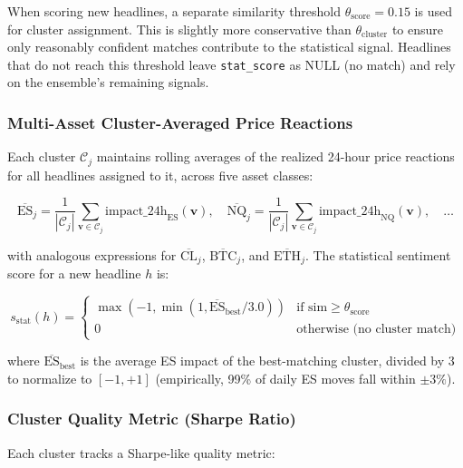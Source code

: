 When scoring new headlines, a separate similarity threshold $\theta_{\text{score}} = 0.15$ is used for cluster assignment. This is slightly more conservative than $\theta_{\text{cluster}}$ to ensure only reasonably confident matches contribute to the statistical signal. Headlines that do not reach this threshold leave \texttt{stat\_score} as NULL (no match) and rely on the ensemble's remaining signals.

\subsubsection{Multi-Asset Cluster-Averaged Price Reactions}

Each cluster $\mathcal{C}_j$ maintains rolling averages of the realized 24-hour price reactions for all headlines assigned to it, across five asset classes:

\begin{equation}
\overline{\text{ES}}_j = \frac{1}{|\mathcal{C}_j|} \sum_{\mathbf{v} \in \mathcal{C}_j} \text{impact\_24h}_\text{ES}(\mathbf{v}), \quad
\overline{\text{NQ}}_j = \frac{1}{|\mathcal{C}_j|} \sum_{\mathbf{v} \in \mathcal{C}_j} \text{impact\_24h}_\text{NQ}(\mathbf{v}), \quad \ldots
\label{eq:cluster_avg}
\end{equation}

with analogous expressions for $\overline{\text{CL}}_j$, $\overline{\text{BTC}}_j$, and $\overline{\text{ETH}}_j$. The statistical sentiment score for a new headline $h$ is:

\begin{equation}
s_{\text{stat}}(h) = 
\begin{cases}
\max(-1, \min(1, \overline{\text{ES}}_{\text{best}} / 3.0)) & \text{if } \text{sim} \geq \theta_{\text{score}} \\
0 & \text{otherwise (no cluster match)}
\end{cases}
\label{eq:stat_score}
\end{equation}

where $\overline{\text{ES}}_{\text{best}}$ is the average ES impact of the best-matching cluster, divided by 3 to normalize to $[-1, +1]$ (empirically, 99\% of daily ES moves fall within $\pm 3\%$).

\subsubsection{Cluster Quality Metric (Sharpe Ratio)}

Each cluster tracks a Sharpe-like quality metric:


